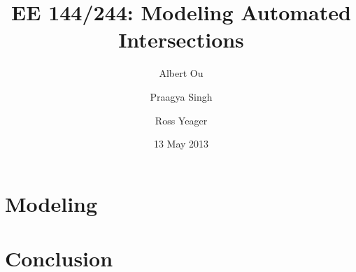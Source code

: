 \documentclass{beamer}
\title[EE 144/244: Automated Intersections]{EE 144/244: Modeling Automated Intersections}
\author[Ou, Singh, Yaeger]{
	Albert Ou \and Praagya Singh \and Ross Yeager}
\institute[UC Berkeley]{University of California, Berkeley}
\date[2013{\textndash}05{\textndash}13]{13 May 2013}
\begin{document}
\frame{\titlepage}



\section{Modeling}




\section{Conclusion}

\end{document}
